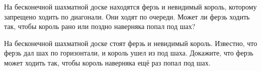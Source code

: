 \documentclass{article}
\begin{document}
\begin{enumerate_boxed}
        \item На бесконечной шахматной доске находятся ферзь и невидимый король, которому запрещено ходить по диагонали.
        Они ходят по очереди.
        Может ли ферзь ходить так, чтобы король рано или поздно наверняка попал под шах?

        \item На бесконечной шахматной доске стоят ферзь и невидимый король.
        Известно, что ферзь дал шах по горизонтали, и король ушел из под шаха.
        Докажите, что ферзь может ходить так, чтобы король наверняка ещё раз попал под шах.

    \end{enumerate_boxed}
\end{document}
